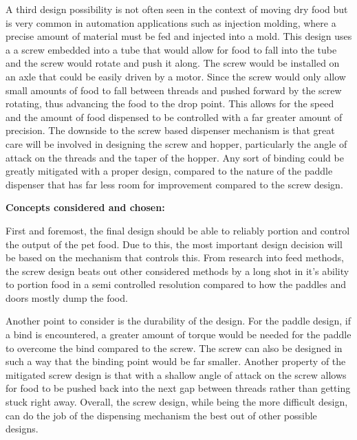 \documentclass[12pt]{article}
\begin{document}
A third design possibility is not often seen in the context of moving dry food but is very common in automation applications such as injection molding, where a precise amount of material must be fed and injected into a mold. This design uses a a screw embedded into a tube that would allow for food to fall into the tube and the screw would rotate and push it along. The screw would be installed on an axle that could be easily driven by a motor. Since the screw would only allow small amounts of
food to fall between threads and pushed forward by the screw rotating, thus advancing the food to the drop point. This allows for the speed and the amount of food dispensed to be controlled with a far greater amount of precision. The downside to the screw based dispenser mechanism is that great care will be involved in designing the screw and hopper, particularly the angle of attack on the threads and the taper of the hopper. Any sort of binding could be greatly mitigated with a proper design, compared to the nature of the paddle dispenser that has far less room for improvement compared to the screw design.

\textbf{Concepts considered and chosen:}

First and foremost, the final design should be able to reliably portion and control the output of the pet food. Due to this, the most important design decision will be based on the mechanism that controls this. From research into feed methods, the screw design beats out other considered methods by a long shot in it’s ability to portion food in a semi controlled resolution compared to how the paddles and doors mostly dump the food.

Another point to consider is the durability of the design. For the paddle design, if a bind is encountered, a greater amount of torque would be needed for the paddle to overcome the bind compared to the screw. The screw can also be designed in such a way that the binding point would be far smaller. Another property of the mitigated screw design is that with a shallow angle of attack on the screw allows for food to be pushed back into the next gap between threads rather than getting stuck right away. Overall, the screw design, while being the more difficult design, can do the job of the dispensing mechanism the best out of other possible designs.
\end{document}
